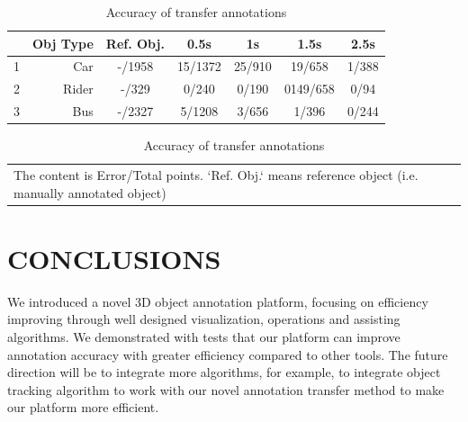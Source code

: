 \documentclass[letterpaper, 10 pt, conference]{ieeeconf}  %
\begin{document}
\begin{table}[h]
	\centering
	\caption{Accuracy of transfer annotations}
	\label{tab:transfer-evaluation}
	\begin{tabular}{|c|r|c|c|c|c|c|}
		\hline
		 & \textbf{Obj Type} & \textbf{Ref. Obj.}&\textbf{0.5s} & \textbf{1s} & \textbf{1.5s}& \textbf{2.5s} \\
		\hline
		\hline
		 1 & Car &-/1958& 15/1372 & 25/910 & 19/658 &  1/388\\
		\hline
  		 2 & Rider &-/329& 0/240 & 0/190 & 0149/658 &  0/94\\
		\hline
  		 3 & Bus &-/2327& 5/1208 & 3/656 & 1/396 &  0/244\\
\hline
	\end{tabular}

\begin{tabular}{p{\linewidth}}
	The content is Error/Total points. `Ref. Obj.` means reference object (i.e. manually annotated object)
\end{tabular}


\end{table}


\section{CONCLUSIONS}
\label{conclusions}

We introduced a novel 3D object annotation platform, focusing on efficiency improving through well designed visualization, operations and assisting algorithms. We demonstrated with tests that our platform can improve annotation accuracy with greater efficiency compared to other tools. The future direction will be to integrate more algorithms, for example, to integrate object tracking algorithm to work with our novel annotation transfer method to make our platform more efficient.



\addtolength{\textheight}{-12cm}   %

\end{document}
